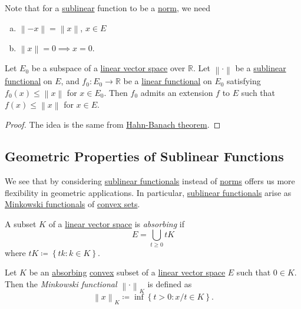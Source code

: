 \begin{remark}
	Note that for a \hyperref[def:sublinear]{sublinear} function to be a \hyperref[def:norm]{norm}, we need
	\begin{enumerate}[(a)]
		\item \(\left\lVert -x\right\rVert =\left\lVert x\right\rVert \), \(x\in E\)
		\item \(\left\lVert x\right\rVert = 0 \implies x = 0\).
	\end{enumerate}
\end{remark}

\begin{theorem}\label{thm:hahn-Banach-Sublinear}
	Let \(E_0\) be a subspace of a \hyperref[def:linear-vector-space]{linear vector space} over \(\mathbb{R} \). Let \(\left\lVert \cdot\right\rVert \) be a \hyperref[def:sublinear]{sublinear functional} on \(E\), and \(f_0 \colon E_0\to \mathbb{R} \) be a \hyperref[def:linear-functional]{linear functional} on \(E_0\) satisfying \(f_0(x) \leq \left\lVert x\right\rVert \) for \(x\in E_0\). Then \(f_0\) admits an extension \(f\) to \(E\) such that \(f(x) \leq \left\lVert x\right\rVert \) for \(x\in E\).
\end{theorem}
\begin{proof}
	The idea is the same from \hyperref[thm:Hahn-Banach]{Hahn-Banach theorem}.
\end{proof}

\subsection{Geometric Properties of Sublinear Functions}
We see that by considering \hyperref[def:sublinear]{sublinear functionals} instead of \hyperref[def:norm]{norms} offers us more flexibility in geometric applications. In particular, \hyperref[def:sublinear]{sublinear functionals} arise as \hyperref[def:Minkowski-functional]{Minkowski functionals} of \hyperref[def:convex-set]{convex sets}.
\begin{definition}[Absorbing]\label{def:absorbing}
	A subset \(K\) of a \hyperref[def:linear-vector-space]{linear vector space} is \emph{absorbing} if
	\[
		E = \bigcup\limits_{t \geq 0} tK
	\]
	where \(tK \coloneqq \left\{ tk \colon k\in K \right\} \).
\end{definition}

\begin{definition}\label{def:Minkowski-functional}
	Let \(K\) be an \hyperref[def:absorbing]{absorbing} \hyperref[def:convex-set]{convex} subset of a \hyperref[def:linear-vector-space]{linear vector space} \(E\) such that \(0\in K\). Then the \emph{Minkowski functional} \(\left\lVert \cdot\right\rVert _K\) is defined as
	\[
		\left\lVert x\right\rVert _K \coloneqq \inf \left\{ t > 0 \colon x / t \in K \right\}.
	\]
\end{definition}

